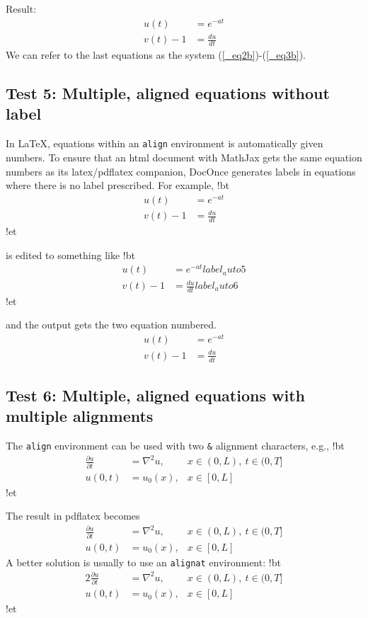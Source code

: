 \documentclass[%
oneside,                 %
final,                   %
10pt]{article}
\begin{document}
\elatexcod

Result:
\begin{align}
u(t)&=e^{-at}
\label{_eq2b}\\ 
v(t) - 1 &= \frac{du}{dt}
\label{_eq3b}
\end{align}
We can refer to the last equations as the system (\ref{_eq2b})-(\ref{_eq3b}).
\subsection{Test 5: Multiple, aligned equations without label}
In {\LaTeX}, equations within an \texttt{align} environment is automatically
given numbers.  To ensure that an html document with MathJax gets the
same equation numbers as its latex/pdflatex companion, DocOnce
generates labels in equations where there is no label prescribed. For
example,
\blatexcod
!bt
\begin{align}
u(t)&=e^{-at}
\\ 
v(t) - 1 &= \frac{du}{dt}
\end{align}
!et

\elatexcod

is edited to something like
\blatexcod
!bt
\begin{align}
u(t)&=e^{-at}
label{_auto5}\\ 
v(t) - 1 &= \frac{du}{dt}
label{_auto6}
\end{align}
!et

\elatexcod

and the output gets the two equation numbered.
\begin{align}
u(t)&=e^{-at}\\ 
v(t) - 1 &= \frac{du}{dt}
\end{align}
\subsection{Test 6: Multiple, aligned equations with multiple alignments}
The \texttt{align} environment can be used with two \Verb!&! alignment characters, e.g.,
\blatexcod
!bt
\begin{align}
\frac{\partial u}{\partial t} &= \nabla^2 u, & x\in (0,L),
\ t\in (0,T]\\ 
u(0,t) &= u_0(x), & x\in [0,L]
\end{align}
!et

\elatexcod

The result in pdflatex becomes
\begin{align}
\frac{\partial u}{\partial t} &= \nabla^2 u, & x\in (0,L),
\ t\in (0,T]\\ 
u(0,t) &= u_0(x), & x\in [0,L]
\end{align}
A better solution is usually to use an \texttt{alignat} environment:
\blatexcod
!bt
\begin{alignat}{2}
\frac{\partial u}{\partial t} &= \nabla^2 u, & x\in (0,L),
\ t\in (0,T]\\ 
u(0,t) &= u_0(x), & x\in [0,L]
\end{alignat}
!et
\end{document}
